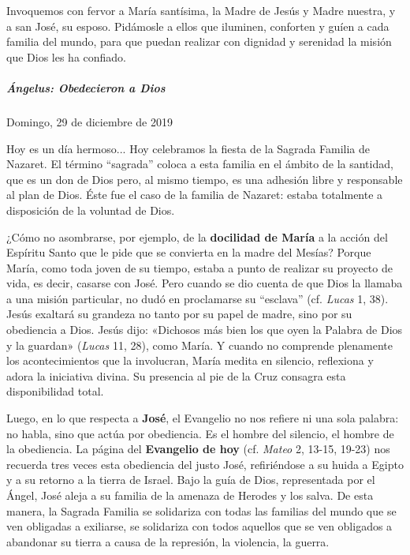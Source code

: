 \documentclass[]{article}
\let\oldsubparagraph\subparagraph
\renewcommand{\subparagraph}[1]{\oldsubparagraph{#1}\mbox{}}
\begin{document}
Invoquemos con fervor a María santísima, la Madre de Jesús y Madre
nuestra, y a san José, su esposo. Pidámosle a ellos que iluminen,
conforten y guíen a cada familia del mundo, para que puedan realizar con
dignidad y serenidad la misión que Dios les ha confiado.

\subparagraph{Ángelus: Obedecieron a
Dios}\label{uxe1ngelus-obedecieron-a-dios}

 Domingo, 29 de diciembre de 2019

Hoy es un día hermoso... Hoy celebramos la fiesta de la Sagrada Familia
de Nazaret. El término ``sagrada'' coloca a esta familia en el ámbito de
la santidad, que es un don de Dios pero, al mismo tiempo, es una
adhesión libre y responsable al plan de Dios. Éste fue el caso de la
familia de Nazaret: estaba totalmente a disposición de la voluntad de
Dios.

¿Cómo no asombrarse, por ejemplo, de la \textbf{docilidad de María} a la
acción del Espíritu Santo que le pide que se convierta en la madre del
Mesías? Porque María, como toda joven de su tiempo, estaba a punto de
realizar su proyecto de vida, es decir, casarse con José. Pero cuando se
dio cuenta de que Dios la llamaba a una misión particular, no dudó en
proclamarse su ``esclava'' (cf. \emph{Lucas} 1, 38). Jesús exaltará su
grandeza no tanto por su papel de madre, sino por su obediencia a Dios.
Jesús dijo: «Dichosos más bien los que oyen la Palabra de Dios y la
guardan» (\emph{Lucas} 11, 28), como María. Y cuando no comprende
plenamente los acontecimientos que la involucran, María medita en
silencio, reflexiona y adora la iniciativa divina. Su presencia al pie
de la Cruz consagra esta disponibilidad total.

Luego, en lo que respecta a \textbf{José}, el Evangelio no nos refiere
ni una sola palabra: no habla, sino que actúa por obediencia. Es el
hombre del silencio, el hombre de la obediencia. La página del
\textbf{Evangelio de hoy} (cf. \emph{Mateo} 2, 13-15, 19-23) nos
recuerda tres veces esta obediencia del justo José, refiriéndose a su
huida a Egipto y a su retorno a la tierra de Israel. Bajo la guía de
Dios, representada por el Ángel, José aleja a su familia de la amenaza
de Herodes y los salva. De esta manera, la Sagrada Familia se solidariza
con todas las familias del mundo que se ven obligadas a exiliarse, se
solidariza con todos aquellos que se ven obligados a abandonar su tierra
a causa de la represión, la violencia, la guerra.
\end{document}
